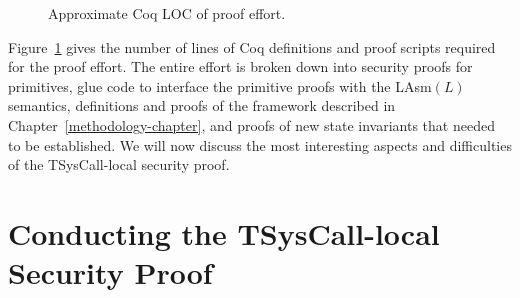 \begin{figure}
\caption{\small{Approximate Coq LOC of proof effort.}}
\label{secure-loc}
\end{figure}

Figure~\ref{secure-loc} gives the number of lines of Coq definitions
and proof scripts required for the proof effort. 
The entire effort is broken down into security proofs for
primitives, glue code to interface the primitive
proofs with the LAsm$(L)$ semantics, definitions and proofs
of the framework described in Chapter~\ref{methodology-chapter}, and
proofs of new state invariants that needed to be established.
We will now discuss the most interesting aspects and difficulties 
of the TSysCall-local security proof.

\section{Conducting the TSysCall-local Security Proof}

